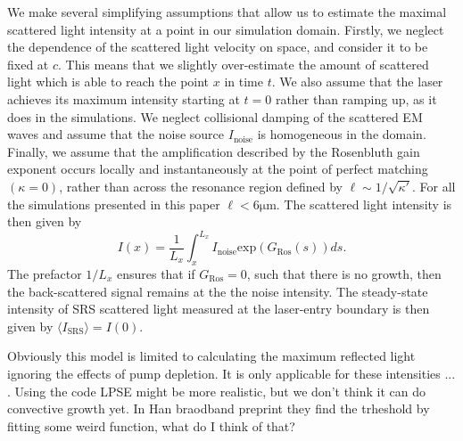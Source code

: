 We make several simplifying assumptions that allow us to estimate the maximal scattered light intensity at a point in our simulation domain. Firstly, we neglect the dependence of the scattered light velocity on space, and consider it to be fixed at $c$. This means that we slightly over-estimate the amount of scattered light which is able to reach the point $x$ in time $t$. We also assume that the laser achieves its maximum intensity starting at $t=0$ rather than ramping up, as it does in the simulations.
We neglect collisional damping of the scattered EM waves and assume that the noise source $I_\mathrm{noise}$ is homogeneous in the domain. Finally, we assume that the amplification described by the Rosenbluth gain exponent occurs locally and instantaneously at the point of perfect
matching $(\kappa=0)$, rather than across the resonance region defined by $\ell \sim 1/\sqrt{\kappa'}$. For all the simulations presented in this paper $\ell < 6\si{\micro\metre}$.
 The scattered light intensity is then given by
 \begin{equation}\label{eqn:fluid_model}
     I(x) = \frac{1}{L_x}\int_x^{L_x}I_\mathrm{noise}\mathrm{exp}(G_\mathrm{Ros}(s)) ds.
 \end{equation}
The prefactor $1/L_x$ ensures that if $G_\mathrm{Ros}=0$, such that there is no growth, then the back-scattered signal remains
at the the noise intensity. The steady-state intensity of SRS scattered light measured at the laser-entry boundary is then given by $\langle I_{\mathrm{SRS}} \rangle = I(0)$.

Obviously this model is limited to calculating the maximum reflected light ignoring the effects of pump depletion.  It is only applicable for these intensities ... . Using the code LPSE might be more realistic, but we don't think it can do convective growth yet. In Han braodband preprint they find the trheshold by fitting some weird function, what do I think of that?

%
%
